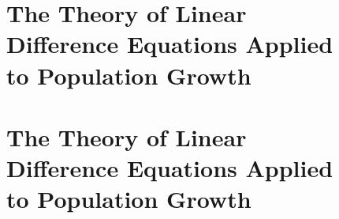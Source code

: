 
\chapter[]{The Theory of Linear\\Difference Equations Applied\\ to Population Growth}

\lipsum[1-10]
\chapter[]{The Theory of Linear\\Difference Equations Applied\\ to Population Growth}

\lipsum[1-10]          
\makeatletter\@specialfalse\makeatother    